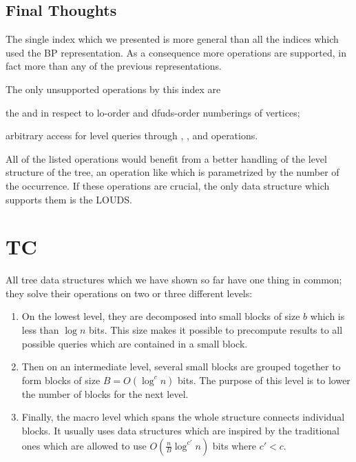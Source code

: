 \subsection{Final Thoughts}

The single index which we presented is more general than all the indices which used the BP representation.
As a consequence more operations are supported, in fact more than any of the previous representations.

The only unsupported operations by this index are
\begin{enuminline}
	\item the \rank{} and \select{} in respect to lo-order and dfuds-order numberings of vertices;
	\item arbitrary access for level queries through \levelSize{}, \levelRank{}, and \levelSelect{} operations.
\end{enuminline}

All of the listed operations would benefit from a better handling of the level structure of the tree, an operation like \fwdSearch{} which is parametrized by the number of the occurrence.
If these operations are crucial, the only data structure which supports them is the LOUDS.

\section{TC}

All tree data structures which we have shown so far have one thing in common; they solve their operations on two or three different levels:
\begin{enumerate}
	\item On the lowest level, they are decomposed into small blocks of size $b$ which is less than $\log n$ bits.
	This size makes it possible to precompute results to all possible queries which are contained in a small block.
	
	\item Then on an intermediate level, several small blocks are grouped together to form blocks of size $B = O(\log^c n)$ bits.
	The purpose of this level is to lower the number of blocks for the next level.
	
	\item Finally, the macro level which spans the whole structure connects individual blocks.
	It usually uses data structures which are inspired by the traditional ones which are allowed to use $O(\frac{n}{B} \log^{c'} n)$ bits where $c' < c$.
\end{enumerate}

